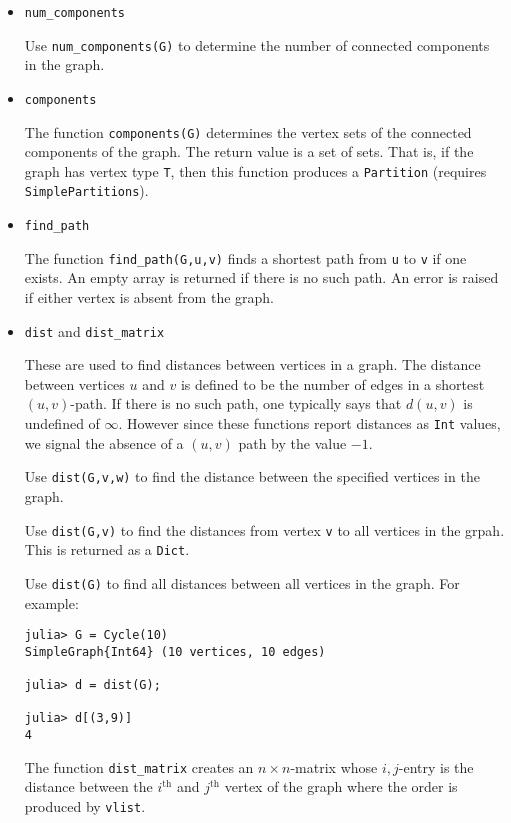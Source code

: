 \documentclass[oneside]{amsart}
\begin{document}
\begin{itemize}
\item \verb|num_components|

  Use \verb|num_components(G)| to determine the number of connected
  components in the graph.

\item \verb|components|

  The function \verb|components(G)| determines the vertex sets of the
  connected components of the graph. The return value is a set of
  sets. That is, if the graph has vertex type \verb|T|, then this
  function produces a \verb|Partition| (requires \verb|SimplePartitions|).


\item \verb|find_path|

  The function \verb|find_path(G,u,v)| finds a shortest path from
  \verb|u| to \verb|v| if one exists. An empty array is returned if
  there is no such path. An error is raised if either vertex is absent
  from the graph.

\item \verb|dist| and \verb|dist_matrix|

  These are used to find distances between vertices in a graph. The
  distance between vertices $u$ and $v$ is defined to be the number of
  edges in a shortest $(u,v)$-path. If there is no such path, one
  typically says that $d(u,v)$ is undefined of $\infty$. However since
  these functions report distances as \verb|Int| values, we signal the
  absence of a $(u,v)$ path by the value $-1$.

  Use \verb|dist(G,v,w)| to find the distance between the specified
  vertices in the graph.

  Use \verb|dist(G,v)| to find the distances from vertex \verb|v| to
  all vertices in the grpah. This is returned as a \verb|Dict|.

  Use \verb|dist(G)| to find all distances between all vertices in the
  graph. For example:
  {\small
\begin{verbatim}
julia> G = Cycle(10)
SimpleGraph{Int64} (10 vertices, 10 edges)

julia> d = dist(G);

julia> d[(3,9)]
4
\end{verbatim}
  }

  The function \verb|dist_matrix| creates an $n\times n$-matrix whose
  $i,j$-entry is the distance between the $i^{\text{th}}$ and
  $j^{\text{th}}$ vertex of the graph where the order is produced by
  \verb|vlist|.


\end{itemize}
\end{document}
